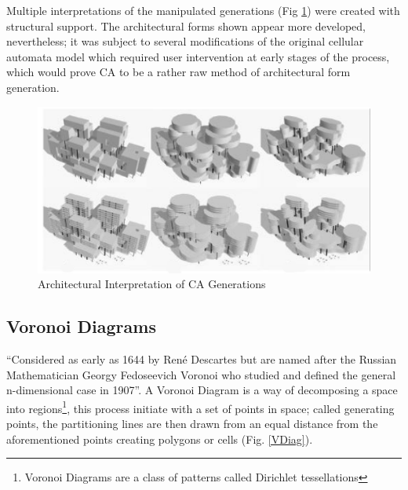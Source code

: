 Multiple interpretations of the manipulated generations (Fig \ref{CA ArchForm}) were created with structural support. The architectural forms shown appear more developed, nevertheless; it was subject to several modifications of the original cellular automata model which required user intervention at early stages of the process, which would prove CA to be a rather raw method of architectural form generation.

\begin{figure}[H]
\centering
\includegraphics[width=\textwidth]{./Images/5-3dCASpaces}
\caption[Architectural Interpretation of CA Generations]{Architectural Interpretation of CA Generations \cite{krawczyk02}}
\label{CA ArchForm}
\end{figure}

\subsection{Voronoi Diagrams}

``Considered as early as 1644 by Ren\'{e} Descartes but are named after the Russian Mathematician Georgy Fedoseevich Voronoi who studied and defined the general n-dimensional case in 1907''\cite{fasoulaki08}. A Voronoi Diagram is a way of decomposing a space into regions\footnote{Voronoi Diagrams are a class of patterns called Dirichlet tessellations}, this process initiate with a set of points in space; called generating points, the partitioning lines are then drawn from an equal distance from the aforementioned points creating polygons or cells (Fig. \ref{VDiag}).

